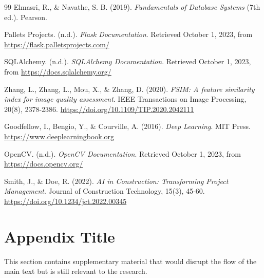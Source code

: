 \documentclass[12pt,a4paper]{report}
\begin{document}
\begin{thebibliography}{99}
    Elmasri, R., \& Navathe, S. B. (2019).
    \textit{Fundamentals of Database Systems} (7th ed.).
    Pearson.

    Pallets Projects. (n.d.).
    \textit{Flask Documentation}.
    Retrieved October 1, 2023, from \url{https://flask.palletsprojects.com/}

    SQLAlchemy. (n.d.).
    \textit{SQLAlchemy Documentation}.
    Retrieved October 1, 2023, from \url{https://docs.sqlalchemy.org/}

    Zhang, L., Zhang, L., Mou, X., \& Zhang, D. (2020).
    \textit{FSIM: A feature similarity index for image quality assessment}.
    IEEE Transactions on Image Processing, 20(8), 2378-2386.
    \href{https://doi.org/10.1109/TIP.2020.2042111}{https://doi.org/10.1109/TIP.2020.2042111}

    Goodfellow, I., Bengio, Y., \& Courville, A. (2016).
    \textit{Deep Learning}.
    MIT Press.
    \href{https://www.deeplearningbook.org}{https://www.deeplearningbook.org}

    OpenCV. (n.d.).
    \textit{OpenCV Documentation}.
    Retrieved October 1, 2023, from \url{https://docs.opencv.org/}

    Smith, J., \& Doe, R. (2022).
    \textit{AI in Construction: Transforming Project Management}.
    Journal of Construction Technology, 15(3), 45-60.
    \href{https://doi.org/10.1234/jct.2022.00345}{https://doi.org/10.1234/jct.2022.00345}
\end{thebibliography}

\appendix  %

\chapter{Appendix Title}  %
This section contains supplementary material that would disrupt the flow of the main text but is still relevant to the research.
\end{document}
